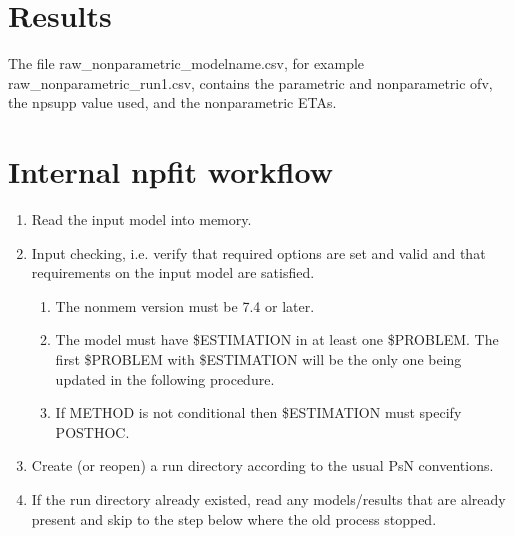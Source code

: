 \section{Results}

The file raw\_nonparametric\_modelname.csv, for example raw\_nonparametric\_run1.csv,
contains the parametric and nonparametric ofv, the npsupp value used,
and the nonparametric ETAs.

\section{Internal npfit workflow}


\begin{enumerate}
\item Read the input model into memory. %
\item Input checking, i.e. verify that required options are set and valid and that requirements on the input model
are satisfied.%
\begin{enumerate}
\item The nonmem version must be 7.4 or later.
\item The model must have \$ESTIMATION in at least one \$PROBLEM. The first \$PROBLEM with \$ESTIMATION will be the
only one being updated in the following procedure.
\item If METHOD is not conditional then \$ESTIMATION must specify POSTHOC.
\end{enumerate}
\item Create (or reopen) a run directory according to the usual PsN conventions.
\item If the run directory already existed, read any models/results that are already present and skip
to the step below where the old process stopped. %

\end{enumerate}
